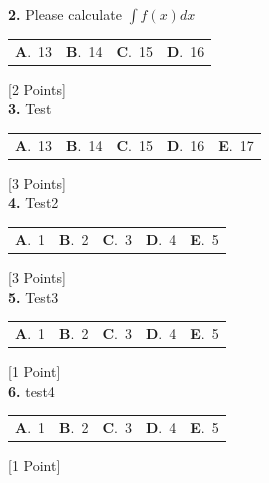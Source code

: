 \documentclass[12pt]{article}
\newcommand{\choice}[2]{\textbf{#1}.~#2}
\begin{document}
\noindent \textbf{\textenglish{2.}} {\textenglish{Please calculate }}\(\int f(x)dx\)

\begin{tabularx}{\linewidth}{@{}*{4}{Y}@{}}
\choice{A}{{{\textenglish{13}}}} & \choice{B}{{{\textenglish{14}}}} & \choice{C}{{{\textenglish{15}}}} & \choice{D}{{{\textenglish{16}}}} \\
\end{tabularx}
\hfill {\textenglish{[2 Points]}}\\[0.5em]

\noindent \textbf{\textenglish{3.}} {\textenglish{Test}}

\begin{tabularx}{\linewidth}{@{}*{5}{Y}@{}}
\choice{A}{{{\textenglish{13}}}} & \choice{B}{{{\textenglish{14}}}} & \choice{C}{{{\textenglish{15}}}} & \choice{D}{{{\textenglish{16}}}} & \choice{E}{{{\textenglish{17}}}} \\
\end{tabularx}
\hfill {\textenglish{[3 Points]}}\\[0.5em]

\noindent \textbf{\textenglish{4.}} {\textenglish{Test2}}

\begin{tabularx}{\linewidth}{@{}*{5}{Y}@{}}
\choice{A}{{{\textenglish{1}}}} & \choice{B}{{{\textenglish{2}}}} & \choice{C}{{{\textenglish{3}}}} & \choice{D}{{{\textenglish{4}}}} & \choice{E}{{{\textenglish{5}}}} \\
\end{tabularx}
\hfill {\textenglish{[3 Points]}}\\[0.5em]

\noindent \textbf{\textenglish{5.}} {\textenglish{Test3}}

\begin{tabularx}{\linewidth}{@{}*{5}{Y}@{}}
\choice{A}{{{\textenglish{1}}}} & \choice{B}{{{\textenglish{2}}}} & \choice{C}{{{\textenglish{3}}}} & \choice{D}{{{\textenglish{4}}}} & \choice{E}{{{\textenglish{5}}}} \\
\end{tabularx}
\hfill {\textenglish{[1 Point]}}\\[0.5em]

\noindent \textbf{\textenglish{6.}} {\textenglish{test4}}

\begin{tabularx}{\linewidth}{@{}*{5}{Y}@{}}
\choice{A}{{{\textenglish{1}}}} & \choice{B}{{{\textenglish{2}}}} & \choice{C}{{{\textenglish{3}}}} & \choice{D}{{{\textenglish{4}}}} & \choice{E}{{{\textenglish{5}}}} \\
\end{tabularx}
\hfill {\textenglish{[1 Point]}}\\[0.5em]
\end{document}
